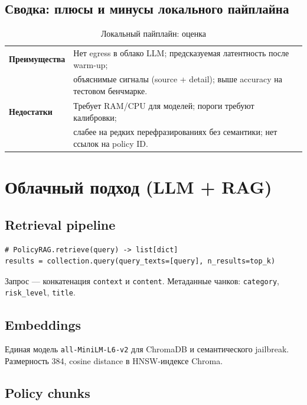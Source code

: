 \documentclass[12pt,a4paper]{report}
\begin{document}
\section{Сводка: плюсы и минусы локального пайплайна}

\begin{table}[H]
\centering
\caption{Локальный пайплайн: оценка}
\begin{tabularx}{\textwidth}{@{}lX@{}}
\toprule
\textbf{Преимущества} & Нет egress в облако LLM; предсказуемая латентность после warm-up; \\
& объяснимые сигналы (source + detail); выше accuracy на тестовом бенчмарке. \\
\midrule
\textbf{Недостатки} & Требует RAM/CPU для моделей; пороги требуют калибровки; \\
& слабее на редких перефразированиях без семантики; нет ссылок на policy ID. \\
\bottomrule
\end{tabularx}
\end{table}

\chapter{Облачный подход (LLM + RAG)}

\section{Retrieval pipeline}

\begin{lstlisting}[style=python]
# PolicyRAG.retrieve(query) -> list[dict]
results = collection.query(query_texts=[query], n_results=top_k)
\end{lstlisting}

Запрос --- конкатенация \texttt{context} и \texttt{content}.
Метаданные чанков: \texttt{category}, \texttt{risk\_level}, \texttt{title}.

\section{Embeddings}

Единая модель \texttt{all-MiniLM-L6-v2} для ChromaDB и семантического jailbreak.
Размерность 384, cosine distance в HNSW-индексе Chroma.

\section{Policy chunks}
\end{document}
